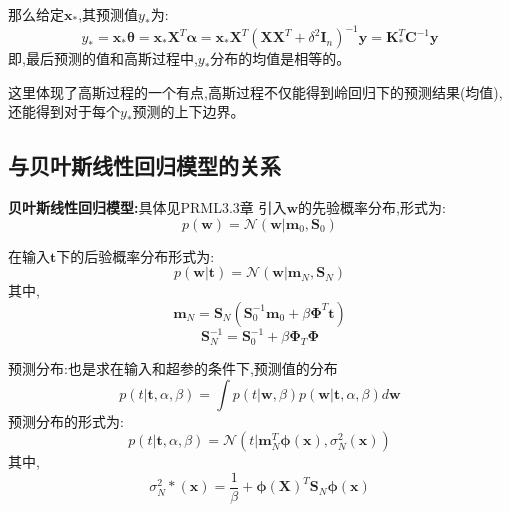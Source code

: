 \documentclass[UTF8,a4paper]{ctexart}
\begin{document}
        那么给定$\bm x_*$,其预测值$y_*$为:
        \begin{equation}
            y_* = \bm x_*\bm \theta = \bm x_* \bm X^T\bm \alpha = \bm x_*\bm X^T(\bm X\bm X^T + \delta^2 \bm I_n)^{-1}\bm y
                    = \bm K_*^T\bm C^{-1}\bm y
        \end{equation}
        即,最后预测的值和高斯过程中,$y_*$分布的均值是相等的。

        {\color{blue}这里体现了高斯过程的一个有点,高斯过程不仅能得到岭回归下的预测结果(均值),还能得到对于每个$y_*$预测的上下边界。}

        \subsection{与贝叶斯线性回归模型的关系}
        \textbf{贝叶斯线性回归模型:}{\color{blue}具体见PRML3.3章}
        引入$\bm w$的先验概率分布,形式为:
        \begin{equation}
            p(\bm w) = \mathcal{N}(\bm w | \bm m_0 , \bm S_0)
        \end{equation}

        在输入$\bm t$下的后验概率分布形式为:
        \begin{equation}
            p(\bm w | \bm t) = \mathcal{N}(\bm w | \bm m_N , \bm S_N)
        \end{equation}
        其中,
        \begin{equation}
            \bm m_N = \bm S_N(\bm S_0^{-1}\bm m_0 + \beta \bm \Phi^T\bm t)
        \end{equation}
        \begin{equation}
            \bm S_N^{-1} = \bm S_0^{-1} + \beta \bm \Phi_T \bm \Phi
        \end{equation}

        预测分布:{\color{blue}也是求在输入和超参的条件下,预测值的分布}
        \begin{equation}
            p(t|\bm t , \alpha ,\beta)  = \int p(t|\bm w,\beta)p(\bm w|\bm t,\alpha , \beta) d\bm  w
        \end{equation}
        预测分布的形式为:
        \begin{equation}
            p(t|\bm t , \alpha ,\beta) = \mathcal{N}(t | \bm m_N^T\bm \phi(\bm x),\sigma_N^2(\bm x))
        \end{equation}
        其中,
        \begin{equation}
            \sigma_N^2*(\bm x) = \frac{1}{\beta} + \bm \phi(\bm X)^T\bm S_N \bm \phi(\bm x)
        \end{equation}
\end{document}
